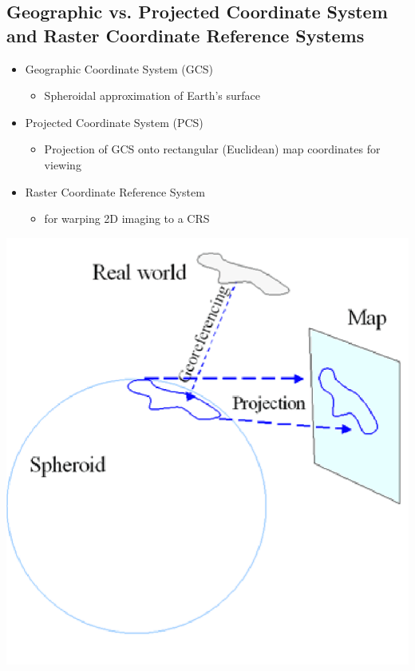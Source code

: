 \documentclass[11pt]{article}
\theoremstyle{definition}
\begin{document}
\subsection{Geographic vs. Projected
Coordinate System and Raster Coordinate Reference Systems}
\begin{itemize}
    \item Geographic Coordinate
    System (GCS)
    \begin{itemize}
        \item Spheroidal
        approximation of Earth’s
        surface
    \end{itemize}
    \item Projected Coordinate
    System (PCS)
    \begin{itemize}
        \item Projection of GCS onto
        rectangular (Euclidean)
        map coordinates for
        viewing
    \end{itemize}
    \item Raster Coordinate Reference System
    \begin{itemize}
        \item for warping 2D imaging to a CRS
    \end{itemize}
\end{itemize}

\includegraphics[width=\textwidth/2]{8.png}
\end{document}
